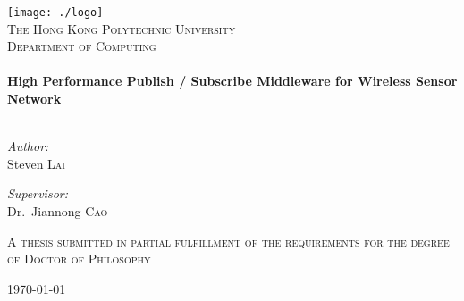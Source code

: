 \begin{titlepage}
\begin{center}

\texttt{[image: ./logo]}\\[1cm]    

\textsc{\LARGE The Hong Kong Polytechnic University}\\[0.5cm]

\textsc{\Large Department of Computing}\\[0.5cm]

\HRule \\[0.4cm]
{ \LARGE \bfseries High Performance Publish / Subscribe Middleware for Wireless Sensor Network}\\[0.4cm]

\HRule \\[1cm]

\begin{minipage}{0.4\textwidth}
\begin{flushleft} \large
\emph{Author:}\\
Steven \textsc{Lai}
\end{flushleft}
\end{minipage}
\begin{minipage}{0.4\textwidth}
\begin{flushright} \large
\emph{Supervisor:} \\
Dr.~Jiannong \textsc{Cao}
\end{flushright}
\end{minipage}

\vspace{2cm}
\textsc{\large A thesis submitted in partial fulfillment of the requirements for the degree of Doctor of Philosophy} 

\vfill

{\large \today}

\end{center}

\end{titlepage}